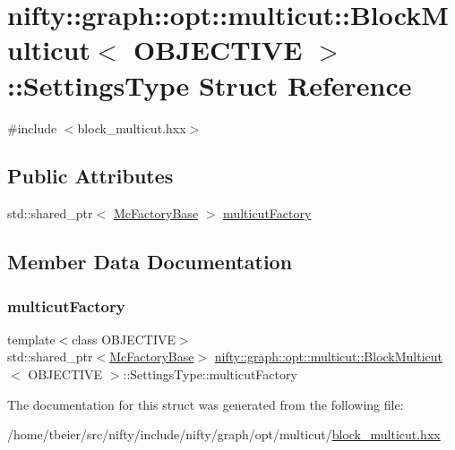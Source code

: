 \hypertarget{structnifty_1_1graph_1_1opt_1_1multicut_1_1BlockMulticut_1_1SettingsType}{}\section{nifty\+:\+:graph\+:\+:opt\+:\+:multicut\+:\+:Block\+Multicut$<$ O\+B\+J\+E\+C\+T\+I\+VE $>$\+:\+:Settings\+Type Struct Reference}
\label{structnifty_1_1graph_1_1opt_1_1multicut_1_1BlockMulticut_1_1SettingsType}


{\ttfamily \#include $<$block\+\_\+multicut.\+hxx$>$}

\subsection*{Public Attributes}
\begin{DoxyCompactItemize}
\item 
std\+::shared\+\_\+ptr$<$ \hyperlink{classnifty_1_1graph_1_1opt_1_1multicut_1_1BlockMulticut_add71703aaed725b89f664a0dba768685}{Mc\+Factory\+Base} $>$ \hyperlink{structnifty_1_1graph_1_1opt_1_1multicut_1_1BlockMulticut_1_1SettingsType_ac564468fa8d3f64216f70a2120cd76c1}{multicut\+Factory}
\end{DoxyCompactItemize}


\subsection{Member Data Documentation}
\mbox{\label{structnifty_1_1graph_1_1opt_1_1multicut_1_1BlockMulticut_1_1SettingsType_ac564468fa8d3f64216f70a2120cd76c1}} 
\subsubsection{\texorpdfstring{multicut\+Factory}{multicutFactory}}
{\footnotesize\ttfamily template$<$class O\+B\+J\+E\+C\+T\+I\+VE$>$ \\
std\+::shared\+\_\+ptr$<$\hyperlink{classnifty_1_1graph_1_1opt_1_1multicut_1_1BlockMulticut_add71703aaed725b89f664a0dba768685}{Mc\+Factory\+Base}$>$ \hyperlink{classnifty_1_1graph_1_1opt_1_1multicut_1_1BlockMulticut}{nifty\+::graph\+::opt\+::multicut\+::\+Block\+Multicut}$<$ O\+B\+J\+E\+C\+T\+I\+VE $>$\+::Settings\+Type\+::multicut\+Factory}



The documentation for this struct was generated from the following file\+:\begin{DoxyCompactItemize}
\item 
/home/tbeier/src/nifty/include/nifty/graph/opt/multicut/\hyperlink{block__multicut_8hxx}{block\+\_\+multicut.\+hxx}\end{DoxyCompactItemize}
